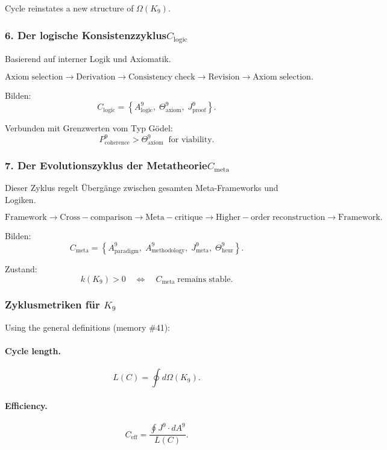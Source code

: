 Cycle reinstates a new structure of $\Omega(K_9)$.


\subsubsection{6. Der logische Konsistenzzyklus$C_{\mathrm{logic}}$}

Basierend auf interner Logik und Axiomatik.

\[
  \mathrm{Axiom\;selection}
  \to
  \mathrm{Derivation}
  \to
  \mathrm{Consistency\;check}
  \to
  \mathrm{Revision}
  \to
  \mathrm{Axiom\;selection}.
\]

Bilden:
\[
 C_{\mathrm{logic}}
  =
  \left\{
    A^9_{\mathrm{logic}},\;
    \Theta^9_{\mathrm{axiom}},\;
    J^9_{\mathrm{proof}}
  \right\}.
\]

Verbunden mit Grenzwerten vom Typ Gödel:
\[
  P^9_{\mathrm{coherence}} > \Theta^9_{\mathrm{axiom}}
  \;\;\text{for viability}.
\]


\subsubsection{7. Der Evolutionszyklus der Metatheorie$C_{\mathrm{meta}}$}

Dieser Zyklus regelt Übergänge zwischen gesamten Meta-Frameworks und Logiken.

\[
  \mathrm{Framework}
  \to
  \mathrm{Cross\!-\!comparison}
  \to
  \mathrm{Meta\!-\!critique}
  \to
  \mathrm{Higher\!-\!order\;reconstruction}
  \to
  \mathrm{Framework}.
\]

Bilden:
\[
 C_{\mathrm{meta}}
 =
 \left\{
   A^9_{\mathrm{paradigm}},\;
   A^9_{\mathrm{methodology}},\;
   J^9_{\mathrm{meta}},\;
   \Theta^9_{\mathrm{heur}}
 \right\}.
\]

Zustand:
\[
  k(K_9) > 0 \quad\Leftrightarrow\quad
  C_{\mathrm{meta}}\;\text{remains stable}.
\]


\subsubsection{Zyklusmetriken für \texorpdfstring{$K_9$}{K_9}}

Using the general definitions (memory \#41):

\paragraph{Cycle length.}
\[
  L(C) = \oint d\Omega(K_9).
\]

\paragraph{Efficiency.}
\[
  C_{\mathrm{eff}} = 
  \frac{\oint J^9 \cdot dA^9}{L(C)}.
\]

